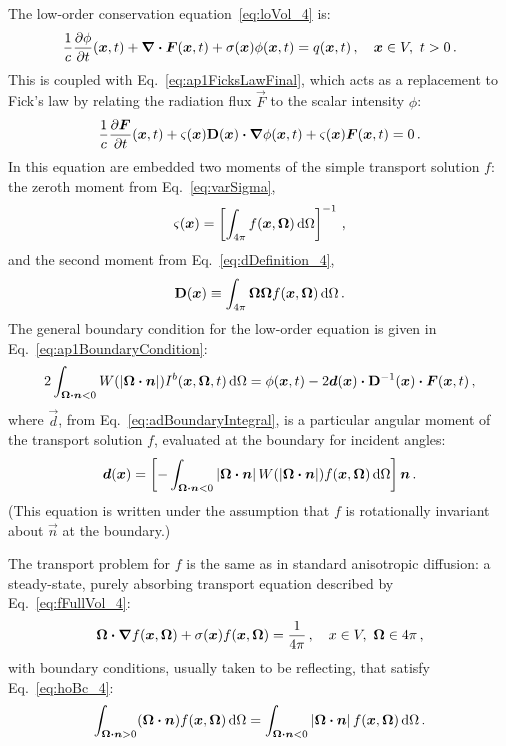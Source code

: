 The low-order conservation equation~\eqref{eq:loVol_4} is:
\begin{equation*}
\frac{1}{c} \frac{\partial \phi}{\partial t} (\bm{x}, t)
+ \bm{\nabla} \bm{\cdot} \bm{F}(\bm{x},t)
+ \sigma(\bm{x}) \phi(\bm{x}, t)
  = q(\bm{x}, t) \,,
  \quad \bm{x} \in V,\ t > 0 \,.
\end{equation*}
This is coupled with Eq.~\eqref{eq:ap1FicksLawFinal}, which acts as a
replacement to Fick's law by relating the radiation flux $\vec{F}$ to the
scalar intensity $\phi$:
\begin{equation*}
  \frac{1}{c}\frac{\partial \bm{F}}{\partial t}(\bm{x},t)
  + \varsigma(\bm{x}) \mathbf{D}(\bm{x}) \bm{\cdot} \bm{\nabla} \phi(\bm{x}, t)
  + \varsigma(\bm{x})\bm{F}(\bm{x},t) 
  = 0 \,.
\end{equation*}
In this equation are embedded two moments of the simple transport solution $f$:
the zeroth moment from Eq.~\eqref{eq:varSigma},
\begin{equation*}
  \varsigma(\bm{x})
  = \left[ \int_{4\pi} f(\bm{x},\bm{\Omega}) \mathop{}\!\mathrm{d} \Omega \right]^{-1} \,,
\end{equation*}
and the second moment from Eq.~\eqref{eq:dDefinition_4},
\begin{equation*}
  \mathbf{D}(\bm{x}) \equiv \int_{4\pi} \bm{\Omega} \bm{\Omega}
  f(\bm{x}, \bm{\Omega}) \mathop{}\!\mathrm{d}\Omega \,.
\end{equation*}
The general boundary condition for the low-order equation is given in
Eq.~\eqref{eq:ap1BoundaryCondition}:
\begin{equation*}
  2 \int_{\bm{\Omega}\bm{\cdot}\bm{n} < 0}
  W(\left| \bm{\Omega}\bm{\cdot}\bm{n} \right|) I^b(\bm{x},\bm{\Omega},t) \mathop{}\!\mathrm{d}\Omega
  = \phi(\bm{x},t)
  - 2 \bm{d}(\bm{x}) \bm{\cdot} \mathbf{D}^{-1}(\bm{x}) \bm{\cdot} \bm{F}(\bm{x},t) \,,
\end{equation*}
where $\vec{d}$, from Eq.~\eqref{eq:adBoundaryIntegral}, is a particular
angular moment of the transport solution $f$, evaluated at the boundary for
incident angles:
\begin{equation*}
  \bm{d}(\bm{x})
  = \left[ - \int_{\bm{\Omega}\bm{\cdot}\bm{n} < 0}
  \left| \bm{\Omega}\bm{\cdot}\bm{n} \right| W(\left| \bm{\Omega}\bm{\cdot}\bm{n} \right|)
  f(\bm{x}, \bm{\Omega}) \mathop{}\!\mathrm{d}\Omega\right] \bm{n}\,.
\end{equation*}
(This equation is written under the assumption that $f$ is rotationally
invariant about $\vec{n}$ at the boundary.)

The transport problem for $f$ is the same as in standard anisotropic diffusion:
a steady-state, purely absorbing transport
equation described by Eq.~\eqref{eq:fFullVol_4}:
\begin{equation*}
  \bm{\Omega}\bm{\cdot} \bm{\nabla} f(\bm{x}, \bm{\Omega})
  + \sigma(\bm{x}) f (\bm{x}, \bm{\Omega}) 
  = \frac{1}{4\pi} \,, \quad x \in V,\ \bm{\Omega} \in 4\pi\,,
\end{equation*}
with boundary conditions, usually taken to be reflecting, that satisfy
Eq.~\eqref{eq:hoBc_4}:
\begin{equation*}
  \int_{\bm{\Omega}\bm{\cdot}\bm{n} > 0} (\bm{\Omega}\bm{\cdot} \bm{n})
  f(\bm{x}, \bm{\Omega}) \mathop{}\!\mathrm{d}\Omega
  =
  \int_{\bm{\Omega}\bm{\cdot}\bm{n} < 0} \left| \bm{\Omega}\bm{\cdot} \bm{n} \right|
  f(\bm{x}, \bm{\Omega}) \mathop{}\!\mathrm{d}\Omega \,.
\end{equation*}

